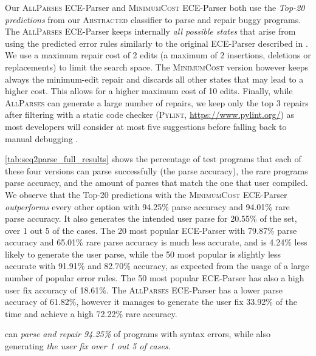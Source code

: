Our \textsc{AllParses} ECE-Parser and \textsc{MinimumCost} ECE-Parser both use
the \emph{Top-20 predictions} from our \textsc{Abstracted} classifier to parse
and repair buggy programs. The \textsc{AllParses} ECE-Parser keeps internally
\emph{all possible states} that arise from using the predicted error rules
similarly to the original ECE-Parser described in \citep{Aho_1972}. We use a
maximum repair cost of 2 edits (\ie a maximum of 2 insertions, deletions or
replacements) to limit the search space. The \textsc{MinimumCost} version
however keeps always the minimum-edit repair and discards all other states that
may lead to a higher cost. This allows for a higher maximum cost of 10 edits.
Finally, while \textsc{AllParses} can generate a large number of repairs, we
keep only the top 3 repairs after filtering with a static code checker
(\textsc{Pylint}, \url{https://www.pylint.org/}) as most developers will
consider at most five suggestions before falling back to manual debugging
\citep{Kochhar2016-oc, Parnin2011-ce}.

\autoref{tab:seq2parse_full_results} shows the percentage of test programs that
each of these four versions can parse successfully (\ie the parse accuracy), the
rare programs parse accuracy, and the amount of parses that match the one that
user compiled. We observe that the Top-20 predictions with the
\textsc{MinimumCost} ECE-Parser \emph{outperforms} every other option with
94.25\% parse accuracy and 94.01\% rare parse accuracy. It also
generates the intended user parse for 20.55\% of the set, \ie over 1 out 5 of the
cases. The 20 most popular ECE-Parser with 79.87\% parse accuracy and 65.01\%
rare parse accuracy is much less accurate, and is 4.24\% less likely to
generate the user parse, while the 50 most popular is slightly less accurate
with 91.91\% and 82.70\% accuracy, as expected from the usage of a large number
of popular error rules. The 50 most popular ECE-Parser has also a high user fix
accuracy of 18.61\%. The \textsc{AllParses} ECE-Parser has a lower parse
accuracy of 61.82\%, however it manages to generate the user fix
33.92\% of the time and achieve a high 72.22\% rare accuracy. 

\begin{framed}
  \noindent \toolname can \emph{parse and repair 94.25\%} of programs with
  syntax errors, while also generating \emph{the user fix over 1 out 5 of
  cases}.
\end{framed}

